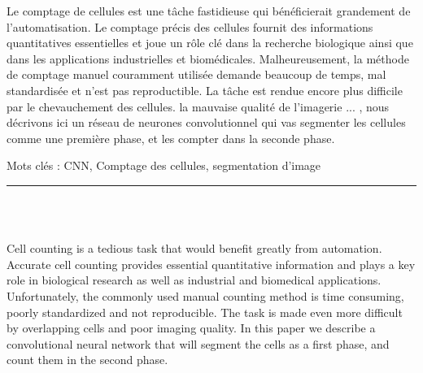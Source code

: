 \documentclass[12pt]{report}
\newenvironment{changemargin}[2]{%
\begin{list}{}{%
\setlength{\topsep}{0pt}%
\setlength{\leftmargin}{#1}%
\setlength{\rightmargin}{#2}%
\setlength{\listparindent}{\parindent}%
\setlength{\itemindent}{\parindent}%
\setlength{\parsep}{\parskip}%
}%
\item[]}{\end{list}}
\begin{document}
Le comptage de cellules est une tâche fastidieuse qui bénéficierait grandement de l'automatisation. Le comptage précis des cellules fournit des informations quantitatives essentielles et joue un rôle clé dans la recherche biologique ainsi que dans les applications industrielles et biomédicales. Malheureusement, la méthode de comptage manuel couramment utilisée demande beaucoup de temps, mal standardisée et n'est pas reproductible. La tâche est rendue encore plus difficile par le chevauchement des cellules. la mauvaise qualité de l'imagerie ... , nous décrivons ici un réseau de neurones convolutionnel qui vas segmenter les cellules comme une première phase, et les compter dans la seconde phase.

\vspace{1in}

\begin{changemargin}{0.9cm}{0.9cm}
Mots clés : CNN, Comptage des cellules, segmentation d'image
\end{changemargin}

\newpage

\vspace*{0.2in}

\thispagestyle{empty}

\begin{center}
    {\color{Black} \rule{3in}{1.4mm} }\\
    \vspace{0.1in}
    \scshape{\fontsize{34}{46}{\bfseries{\color{Black}{Abstract}}}}
    \\
    \vspace{0.6in}
\end{center}
\begin{changemargin}{0.9cm}{0.9cm}
\hspace*{0.16in}

Cell counting is a tedious task that would benefit greatly from automation. Accurate cell counting provides essential quantitative information and plays a key role in biological research as well as industrial and biomedical applications. Unfortunately, the commonly used manual counting method is time consuming, poorly standardized and not reproducible. The task is made even more difficult by overlapping cells and poor imaging quality. In this paper we describe a convolutional neural network that will segment the cells as a first phase, and count them in the second phase.

\end{changemargin}
\end{document}
